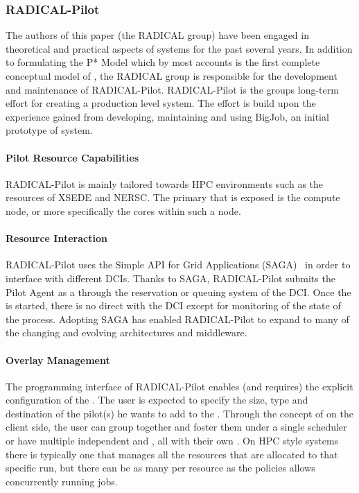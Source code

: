 \documentclass{sig-alternate}
\begin{document}
%
%
\subsubsection{RADICAL-Pilot}
\label{sec:radicalpilot}

The authors of this paper (the RADICAL group) have been engaged in theoretical
and practical aspects of \pilot systems for the past several years. In addition
to formulating the P* Model\cite{} which by most accounts is the first complete
conceptual model of \pilots, the RADICAL group is responsible for the
development and maintenance of RADICAL-Pilot\cite{}. RADICAL-Pilot is the
groups long-term effort for creating a production level \pilot system. The
effort is build upon the experience gained from developing, maintaining and
using BigJob\cite{}, an initial prototype of \pilot system.

\paragraph{Pilot Resource Capabilities}

RADICAL-Pilot is mainly tailored towards HPC environments such as the resources
of XSEDE and NERSC\cite{}. The primary  that is exposed is the
compute node, or more specifically the cores within such a node.

\paragraph{Resource Interaction}

RADICAL-Pilot uses the Simple API for Grid Applications
(SAGA)~\cite{ogf-gfd-90, sagastuff} in order to interface with different DCIs.
Thanks to SAGA, RADICAL-Pilot submits the Pilot Agent as a  through
the reservation or queuing system of the DCI. Once the  is
started, there is no direct  with the DCI except for
monitoring of the state of the  process. Adopting SAGA has
enabled RADICAL-Pilot to expand to many of the changing and evolving
architectures and middleware.

\paragraph{Overlay Management}

The programming interface of RADICAL-Pilot enables (and requires) the explicit
configuration of the . The user is expected to specify the size,
type and destination of the pilot(s) he wants to add to the .
Through the concept of  on the client side, the user can
group \pilots together and foster them under a single scheduler or have
multiple independent  and \pilots, all with their own
. On HPC style systems there is typically one \pilot that
manages all the resources that are allocated to that specific run, but there
can be as many \pilots per resource as the policies allows concurrently running
jobs.
\end{document}
